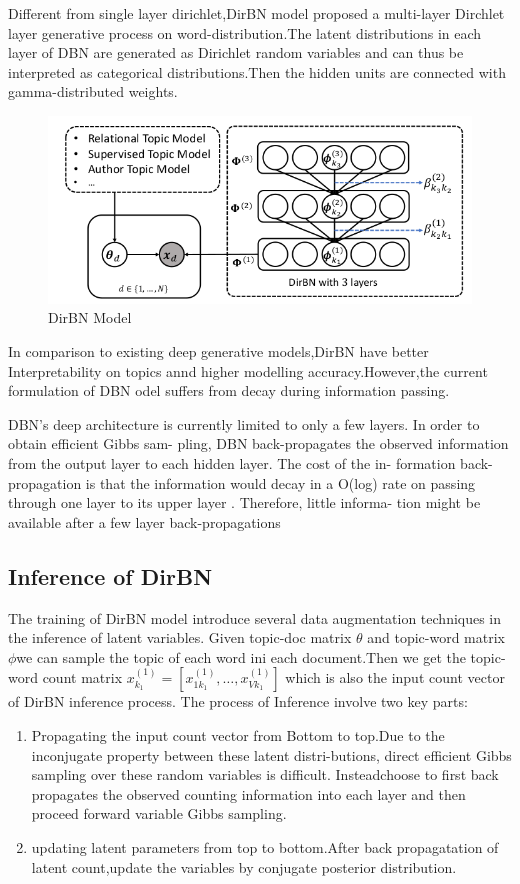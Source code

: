 Different from single layer dirichlet,DirBN model proposed a multi-layer Dirchlet layer generative process on word-distribution.The latent distributions in each layer of DBN are generated as Dirichlet
random variables and can thus be interpreted as categorical
distributions.Then  the hidden units are connected with gamma-distributed weights.

\begin{figure}[htbp]
\includegraphics[width = 13cm]{dirbn.png}
\caption{DirBN Model}
\label{fig:DirBN Model}
\end{figure}

In comparison to existing deep generative models,DirBN have better Interpretability on topics annd higher modelling accuracy.However,the current formulation of DBN odel suffers from decay during information passing.

DBN’s deep architecture is currently limited to
only a few layers. In order to obtain efficient Gibbs sam-
pling, DBN back-propagates the observed information from
the output layer to each hidden layer. The cost of the in-
formation back-propagation is that the information would
decay in a O(log) rate on passing through one layer to its
upper layer \cite{Zhou}. Therefore, little informa-
tion might be available after a few layer back-propagations
\subsection{Inference of DirBN}
The training of DirBN model introduce several data augmentation techniques in the inference of latent variables.
Given topic-doc matrix $\theta$ and topic-word matrix $\phi$we can sample the topic of each word ini each document.Then we get the topic-word count matrix $x_{k_1}^{(1)} = [x_{1k_1}^{(1)},\dots,x_{Vk_1}^{(1)}]$ which is also the input count vector of DirBN inference process.
The process of Inference involve two key parts:
\begin{enumerate}
  \item Propagating the input count vector from
Bottom to top.Due to the inconjugate property between these latent distri-butions, direct efficient Gibbs sampling over these random variables is difficult. Insteadchoose to first back propagates the observed counting information into each layer and then proceed forward variable Gibbs sampling.
\item updating latent parameters from top to bottom.After back propagatation of latent count,update the variables by conjugate posterior distribution.

\end{enumerate}
